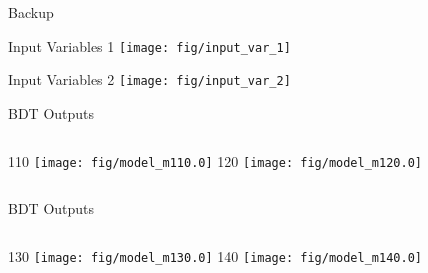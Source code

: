 \documentclass[t, 8pt]{beamer}
\begin{document}

\begin{frame}{Backup}
\end{frame}

\begin{frame}{Input Variables 1}
    \texttt{[image: fig/input\_var\_1]}
\end{frame}

\begin{frame}{Input Variables 2}
    \texttt{[image: fig/input\_var\_2]}
\end{frame}


\begin{frame}{BDT Outputs}
  \vspace{1cm}
  \begin{columns}[c]
    110
    \texttt{[image: fig/model\_m110.0]}
    120
    \texttt{[image: fig/model\_m120.0]}
  \end{columns}
\end{frame}

\begin{frame}{BDT Outputs}
  \vspace{1cm}
  \begin{columns}[c]
    130
    \texttt{[image: fig/model\_m130.0]}
    140
    \texttt{[image: fig/model\_m140.0]}
  \end{columns}
\end{frame}
\end{document}
